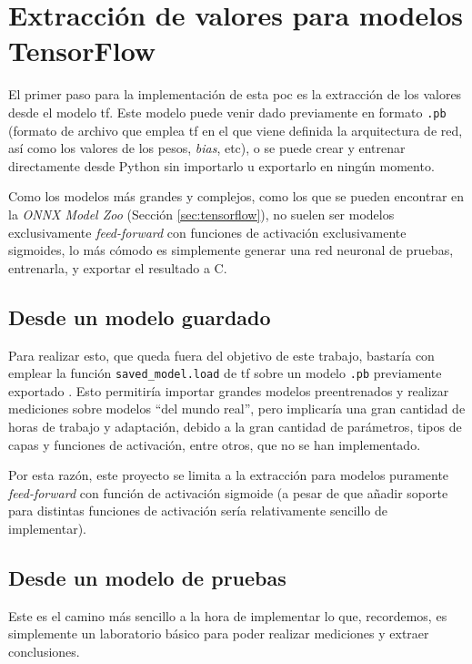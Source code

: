 \section{Extracción de valores para modelos TensorFlow}
\label{sec:extraccion_valores_modelo_tf}
El primer paso para la implementación de esta \acrshort{poc} es la extracción de los valores desde el modelo \acrlong{tf}. Este modelo puede venir dado previamente en formato \texttt{.pb} (formato de archivo que emplea \acrlong{tf} en el que viene definida la arquitectura de red, así como los valores de los pesos, \textit{bias}, etc), o se puede crear y entrenar directamente desde Python sin importarlo u exportarlo en ningún momento.

Como los modelos más grandes y complejos, como los que se pueden encontrar en la \textit{ONNX Model Zoo} (Sección \ref{sec:tensorflow}), no suelen ser modelos exclusivamente \textit{feed-forward} con funciones de activación exclusivamente sigmoides, lo más cómodo es simplemente generar una red neuronal de pruebas, entrenarla, y exportar el resultado a C.

\subsection{Desde un modelo guardado}
\label{ssec:desde_modelo_guardado}
Para realizar esto, que queda fuera del objetivo de este trabajo, bastaría con emplear la función \texttt{saved\_model.load} de \acrlong{tf} sobre un modelo \texttt{.pb} previamente exportado \cite{tensorflow_saved_model}. Esto permitiría importar grandes modelos preentrenados y realizar mediciones sobre modelos ``del mundo real'', pero implicaría una gran cantidad de horas de trabajo y adaptación, debido a la gran cantidad de parámetros, tipos de capas y funciones de activación, entre otros, que no se han implementado.

Por esta razón, este proyecto se limita a la extracción para modelos puramente \textit{feed-forward} con función de activación sigmoide (a pesar de que añadir soporte para distintas funciones de activación sería relativamente sencillo de implementar).

\subsection{Desde un modelo de pruebas}
\label{ssec:desde_modelo_de_pruebas}
Este es el camino más sencillo a la hora de implementar lo que, recordemos, es simplemente un laboratorio básico para poder realizar mediciones y extraer conclusiones.

